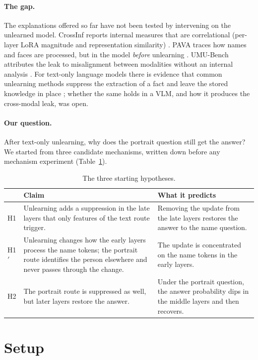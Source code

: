 \documentclass[11pt]{article}
\newcommand{\Hp}{H1$'$}
\begin{document}
\paragraph{The gap.} The explanations offered so far have not been tested by intervening
on the unlearned model. CrossInf reports internal measures that are correlational
(per-layer LoRA magnitude and representation similarity) \cite{crossinf}. PAVA traces how
names and faces are processed, but in the model \emph{before} unlearning \cite{pava}.
UMU-Bench attributes the leak to misalignment between modalities without an internal
analysis \cite{umubench}. For text-only language models there is evidence that common
unlearning methods suppress the extraction of a fact and leave the stored knowledge in
place \cite{hong2024,guo2024}; whether the same holds in a VLM, and how it produces the
cross-modal leak, was open.

\paragraph{Our question.} After text-only unlearning, why does the portrait question still
get the answer? We started from three candidate mechanisms, written down before any
mechanism experiment (Table~\ref{tab:hyp}).

\begin{table}[htbp]
\centering\small
\begin{tabularx}{\linewidth}{@{}lXX@{}}
\toprule
 & Claim & What it predicts\\
\midrule
H1 & Unlearning adds a suppression in the late layers that only features of the text
route trigger. & Removing the update from the late layers restores the answer to the name
question.\\
\Hp & Unlearning changes how the early layers process the name tokens; the portrait route
identifies the person elsewhere and never passes through the change. & The update is
concentrated on the name tokens in the early layers.\\
H2 & The portrait route is suppressed as well, but later layers restore the answer. &
Under the portrait question, the answer probability dips in the middle layers and then
recovers.\\
\bottomrule
\end{tabularx}
\caption{The three starting hypotheses.}
\label{tab:hyp}
\end{table}

\section{Setup}
\end{document}
